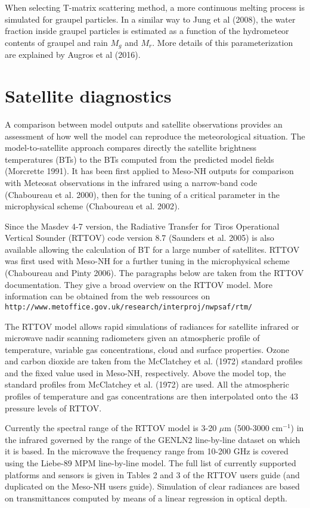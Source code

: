 \begin{description}
When selecting T-matrix scattering method, a more continuous melting process is simulated for graupel particles. 
In a similar way to Jung et al (2008), the water
fraction inside graupel particles is estimated as a function of the hydrometeor contents of graupel and rain $M_g$ and $M_r$.
More details of this parameterization are explained by Augros et al (2016). 
\end{description}

\section{Satellite diagnostics}
A comparison between model outputs and satellite observations provides an assessment of how well the model can reproduce the meteorological situation.
 The model-to-satellite approach compares directly the satellite brightness temperatures (BTs) to the BTs computed from the predicted model fields 
(Morcrette 1991). It has been first applied to Meso-NH outputs for comparison
 with Meteosat observations in the infrared using a narrow-band code 
(Chaboureau et al. 2000), then for the tuning of a critical parameter in the microphysical scheme (Chaboureau et al. 2002).

Since the Masdev 4-7 version, the Radiative Transfer for Tiros Operational Vertical Sounder (RTTOV) code version 8.7 (Saunders et al. 2005) is also available
allowing the calculation of BT for a large number of satellites. RTTOV was first used with Meso-NH for a further tuning in the microphysical scheme (Chaboureau and Pinty 2006). The paragraphs below are taken from the RTTOV documentation. They give a broad overview on the RTTOV model. More information can be obtained from the web ressources on {\tt http://www.metoffice.gov.uk/research/interproj/nwpsaf/rtm/ }

The RTTOV model allows rapid simulations of radiances for satellite infrared or
microwave nadir scanning radiometers given an atmospheric profile of
temperature, variable gas concentrations, cloud and surface properties.
Ozone and carbon dioxide are taken from the McClatchey et al. (1972) standard
profiles and the fixed value used in Meso-NH, respectively. Above the model
top, the standard profiles from McClatchey et al. (1972) are used.
All the atmospheric profiles of temperature and gas concentrations are then
interpolated onto the 43 pressure levels of RTTOV.

Currently the spectral range of the RTTOV model is 3-20 $\mu$m (500-3000
cm$^{-1}$)  in the infrared governed by the range of the GENLN2
line-by-line dataset on which it is based.
In the microwave the frequency range from 10-200 GHz is covered using
the Liebe-89 MPM line-by-line model. The full list of currently
supported platforms and sensors is given in Tables 2 and 3 of
the RTTOV users guide (and duplicated on the Meso-NH users guide).
Simulation of clear radiances are based on transmittances computed by means
of a linear regression in optical depth.

